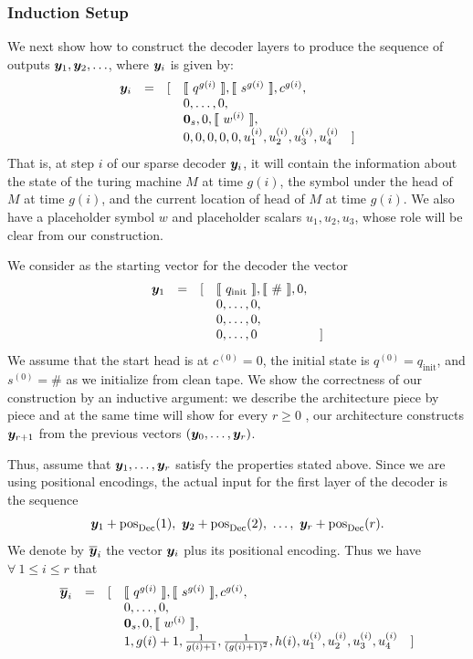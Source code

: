 \subsubsection*{Induction Setup}
We next show how to construct the decoder layers to produce the sequence of outputs ${\bm{y}}_1,{\bm{y}}_2,\ldots$,
where ${\bm{y}}_i$ is given by:
\begin{equation*}
\begin{array}{rcllr}
{{\bm{y}}}_i & = & [ 
& \llbracket\ q^{g(i)}\ \rrbracket,\llbracket\ s^{g(i)}\ \rrbracket,c^{g(i)}, \\
&&& 0,\ldots,0, \\
&&& {\bm{0}}_s,0,\llbracket\ w^{(i)}\ \rrbracket, \\
&&& 0,0,0,0,0,u_1^{(i)},u_2^{(i)},u_3^{(i)},u_4^{(i)} & ] 
\end{array}
\end{equation*}
That is, at step $i$ of our sparse decoder ${\bm{y}}_i$, it will contain the information about the state of the turing machine $M$ at time $g(i)$, the symbol under the head of $M$ at time $g(i)$, and the current location of head of $M$ at time $g(i)$.
We also have a placeholder symbol $w$ and placeholder scalars $u_1,u_2, u_3$, whose role will be clear from our construction.

We consider as the starting vector for the decoder the vector
\begin{equation*}
\begin{array}{rcllr}
{{\bm{y}}}_1 & = & [ 
& \llbracket\ q_{\text{init}}\ \rrbracket,\llbracket\ \#\ \rrbracket,0, \\
&&& 0,\ldots,0, \\
&&& 0,\ldots,0, \\
&&& 0,\ldots,0 & ] 
\end{array}
\end{equation*}
We assume that the start head is at $c^{(0)}=0$, the initial state is $q^{(0)}=q_{\text{init}}$, and $s^{(0)}=\#$ as we initialize from clean tape.
We show the correctness of our construction by an inductive argument:
we describe the architecture piece by piece and at the same time will show for every $r\geq 0$ 
, our architecture constructs ${\bm{y}}_{r+1}$ from the previous vectors 
$({\bm{y}}_0,\ldots,{\bm{y}}_r)$.

Thus, assume that ${\bm{y}}_1,\ldots,{\bm{y}}_r$ satisfy the properties stated above. 
Since we are using positional encodings, 
the actual input for the first layer of the decoder is the sequence
\[
\vy_1+\penc_{\Dec}(1),\ \vy_2+\penc_{\Dec}(2),\ \ldots,\ \vy_{r}+\penc_{\Dec}(r).
\]
We denote by $\overline{{\bm{y}}}_i$ the vector ${\bm{y}}_i$ plus its positional encoding.
Thus we have $\forall \ 1 \leq i \leq r$ that
\begin{equation*}
\begin{array}{rcllr}
\overline{{\bm{y}}}_i & = & [ 
& \llbracket\ q^{g(i)}\ \rrbracket,\llbracket\ s^{g(i)}\ \rrbracket,c^{g(i)}, \\
&&& 0,\ldots,0, \\
&&& {\bm{0}}_s,0,\llbracket\ w^{(i)}\ \rrbracket, \\
&&& 1,g(i)+1,\frac{1}{g(i)+1},\frac{1}{(g(i)+1)^2},h(i),u_1^{(i)},u_2^{(i)},u_3^{(i)},u_4^{(i)} &] 
\end{array}
\end{equation*}


